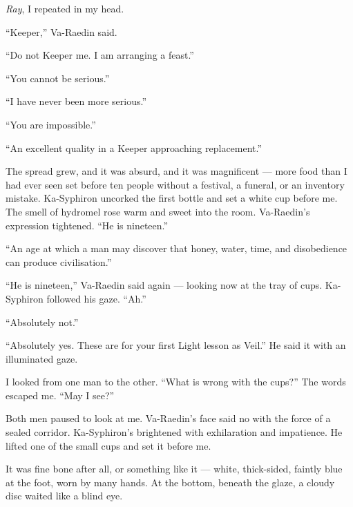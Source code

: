 \emph{Ray}, I repeated in my head.\par

``Keeper,'' Va-Raedin said.\par

``Do not Keeper me. I am arranging a feast.''\par

``You cannot be serious.''\par

``I have never been more serious.''\par

``You are impossible.''\par

``An excellent quality in a Keeper approaching replacement.''\par

The spread grew, and it was absurd, and it was magnificent --- more food than I had ever seen set before ten people without a festival, a funeral, or an inventory mistake.
Ka-Syphiron uncorked the first bottle and set a white cup before me. The smell of hydromel rose warm and sweet into the room.
Va-Raedin's expression tightened. ``He is nineteen.''\par

``An age at which a man may discover that honey, water, time, and disobedience can produce civilisation.''\par

``He is nineteen,'' Va-Raedin said again --- looking now at the tray of cups.
Ka-Syphiron followed his gaze. ``Ah.''\par

``Absolutely not.''\par

``Absolutely yes. These are for your first Light lesson as Veil.'' He said it with an illuminated gaze.\par

I looked from one man to the other. ``What is wrong with the cups?''
The words escaped me. ``May I see?''\par

Both men paused to look at me.
Va-Raedin's face said no with the force of a sealed corridor. Ka-Syphiron's brightened with exhilaration and impatience. He lifted one of the small cups and set it before me.\par

It was fine bone after all, or something like it --- white, thick-sided, faintly blue at the foot, worn by many hands. At the bottom, beneath the glaze, a cloudy disc waited like a blind eye.\par

